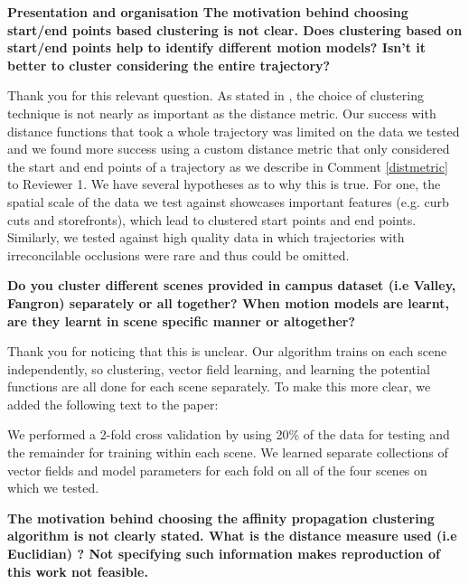 \documentclass[usenames,dvipsnames]{article}
\providecommand{\response}[1]{
\noindent
\noindent\colorbox{gray!20}{
\parbox{\textwidth}{
\setlength{\parskip}{.1in}
\setlength{\parindent}{.1in}
#1}
}
}
\begin{document}
\begin{enumerate}
\begin{item}
\textbf{Presentation and organisation
The motivation behind choosing start/end points based clustering is not
clear. Does clustering based on start/end points help to identify
different motion models? Isn't it better to cluster considering the
entire trajectory? }
\end{item}

Thank you for this relevant question.
As stated in \cite{Morris2009}, the choice of clustering technique is not nearly as important as the distance metric. 
Our success with distance functions that took a whole trajectory was limited on the data we tested and we found more success using a custom distance metric that only considered the start and end points of a trajectory as we describe in Comment \ref{distmetric} to Reviewer 1. 
We have several hypotheses as to why this is true.  
For one, the spatial scale of the data we test against showcases important features (e.g. curb cuts and storefronts), which lead to clustered start points and end points. 
Similarly, we tested against high quality data in which trajectories with irreconcilable occlusions were rare and thus could be omitted. 


\begin{item}
\textbf{Do you cluster different scenes provided in campus dataset \cite{Alahi2016} (i.e
Valley, Fangron) separately or all together? When motion models are
learnt, are they learnt in scene specific manner or altogether?}
\end{item}

Thank you for noticing that this is unclear. 
Our algorithm trains on each scene independently, so clustering, vector field learning, and learning the potential functions are all done for each scene separately. 
To make this more clear, we added the following text to the paper:

\reversemarginpar{}
\response{We performed a 2-fold cross validation by using 20\% of the data for testing and the remainder for training within each scene. 
We learned separate collections of vector fields and model parameters for each fold on all of the four scenes on which we tested.}


\begin{item} \label{distmetric}
\textbf{The motivation behind choosing the affinity propagation clustering algorithm is not clearly stated. 
What is the distance measure used (i.e Euclidian) ? 
Not specifying such information makes reproduction of this work not feasible. }


\end{item}
\end{enumerate}
\end{document}
